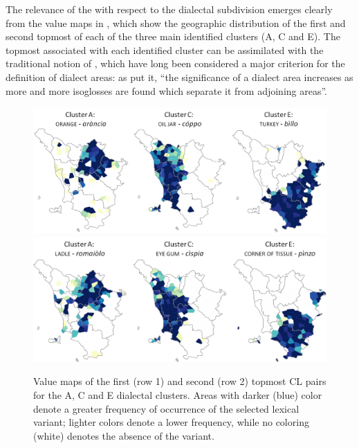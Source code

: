 \documentclass[output=paper]{LSP/langsci}
\begin{document}
 
The relevance of the  with respect to the dialectal subdivision emerges clearly from the value maps in , which show the geographic distribution of the first and second topmost  of each of the three main identified clusters (A, C and E). The topmost  associated with each identified cluster can be assimilated with the traditional notion of , which have long been considered a major criterion for the definition of dialect areas: as \citet{chambers_dialectology_1998} put it, “the significance of a dialect area increases as more and more isoglosses are found which separate it from adjoining areas”.



\begin{figure}[t]
\includegraphics[width=\textwidth]{illustrations/monte_wiel_fig21}\\
\includegraphics[width=\textwidth]{illustrations/monte_wiel_fig22} 
\caption{Value maps of the first (row 1) and second (row 2) topmost CL pairs for the A, C and E dialectal clusters. Areas with darker (blue) color denote a greater frequency of occurrence of the selected lexical variant; lighter colors denote a lower frequency, while no coloring (white) denotes the absence of the variant.}
\label{fig:2}
\end{figure}
\end{document}
